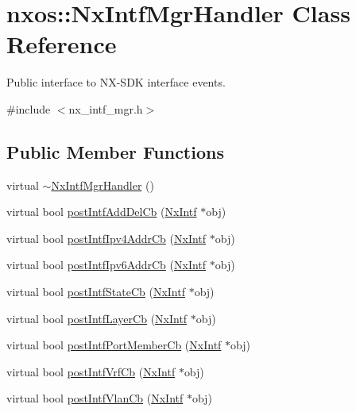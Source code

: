 \hypertarget{classnxos_1_1_nx_intf_mgr_handler}{}\section{nxos\+:\+:Nx\+Intf\+Mgr\+Handler Class Reference}
\label{classnxos_1_1_nx_intf_mgr_handler}


Public interface to N\+X-\/\+S\+DK interface events.  




{\ttfamily \#include $<$nx\+\_\+intf\+\_\+mgr.\+h$>$}

\subsection*{Public Member Functions}
\begin{DoxyCompactItemize}
\item 
virtual \mbox{\hyperlink{classnxos_1_1_nx_intf_mgr_handler_a565ee1dba09df646d82cccad25d914c4}{$\sim$\+Nx\+Intf\+Mgr\+Handler}} ()
\item 
virtual bool \mbox{\hyperlink{classnxos_1_1_nx_intf_mgr_handler_afe79bff5ee5b314111e2ce7c7226e73f}{post\+Intf\+Add\+Del\+Cb}} (\mbox{\hyperlink{classnxos_1_1_nx_intf}{Nx\+Intf}} $\ast$obj)
\item 
virtual bool \mbox{\hyperlink{classnxos_1_1_nx_intf_mgr_handler_a8f96e0a3a70f5f566b8f0f5928bf5e64}{post\+Intf\+Ipv4\+Addr\+Cb}} (\mbox{\hyperlink{classnxos_1_1_nx_intf}{Nx\+Intf}} $\ast$obj)
\item 
virtual bool \mbox{\hyperlink{classnxos_1_1_nx_intf_mgr_handler_ad845ed26b457bc0bdc7a9c79a94acdaf}{post\+Intf\+Ipv6\+Addr\+Cb}} (\mbox{\hyperlink{classnxos_1_1_nx_intf}{Nx\+Intf}} $\ast$obj)
\item 
virtual bool \mbox{\hyperlink{classnxos_1_1_nx_intf_mgr_handler_a9c3d4d357b1f0ab07558b4611c693755}{post\+Intf\+State\+Cb}} (\mbox{\hyperlink{classnxos_1_1_nx_intf}{Nx\+Intf}} $\ast$obj)
\item 
virtual bool \mbox{\hyperlink{classnxos_1_1_nx_intf_mgr_handler_aca73f02d8ce050cb1bb44fddc6338f76}{post\+Intf\+Layer\+Cb}} (\mbox{\hyperlink{classnxos_1_1_nx_intf}{Nx\+Intf}} $\ast$obj)
\item 
virtual bool \mbox{\hyperlink{classnxos_1_1_nx_intf_mgr_handler_ae3a76ba4fb97b941d9f11e9210d89a94}{post\+Intf\+Port\+Member\+Cb}} (\mbox{\hyperlink{classnxos_1_1_nx_intf}{Nx\+Intf}} $\ast$obj)
\item 
virtual bool \mbox{\hyperlink{classnxos_1_1_nx_intf_mgr_handler_aa6f8bc5b1cfa6d99e863c8ede3cafa5f}{post\+Intf\+Vrf\+Cb}} (\mbox{\hyperlink{classnxos_1_1_nx_intf}{Nx\+Intf}} $\ast$obj)
\item 
virtual bool \mbox{\hyperlink{classnxos_1_1_nx_intf_mgr_handler_aad14cab2e803ceadef82870303db526c}{post\+Intf\+Vlan\+Cb}} (\mbox{\hyperlink{classnxos_1_1_nx_intf}{Nx\+Intf}} $\ast$obj)
\end{DoxyCompactItemize}


